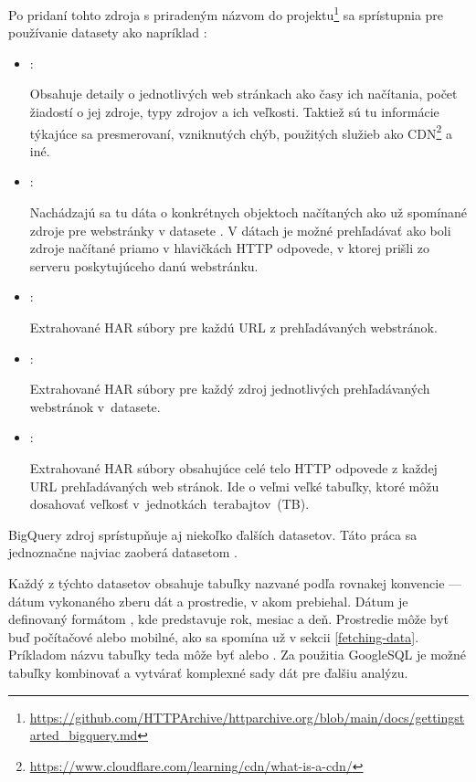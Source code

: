 \pagebreak

\noindent Po pridaní tohto zdroja s priradeným názvom  do projektu\footnote{\href{https://github.com/HTTPArchive/httparchive.org/blob/main/docs/gettingstarted\_bigquery.md}{https://github.com/HTTPArchive/httparchive.org/blob/main/docs/gettingstarted\_bigquery.md}} sa sprístupnia pre používanie datasety ako napríklad \cite{httparchive-repo}:

\begin{itemize}
    \item {}:

    Obsahuje detaily o jednotlivých web stránkach ako časy ich načítania, počet žiadostí o jej zdroje, typy zdrojov a ich veľkosti.
    Taktiež sú tu informácie týkajúce sa presmerovaní, vzniknutých chýb, použitých služieb ako CDN\footnote{\href{https://www.cloudflare.com/learning/cdn/what-is-a-cdn/}{https://www.cloudflare.com/learning/cdn/what-is-a-cdn/}} a iné.
    
    \item {}:

    Nachádzajú sa tu dáta o konkrétnych objektoch načítaných ako už spomínané zdroje pre webstránky v datasete .
    V dátach je možné prehľadávať ako boli zdroje načítané priamo v hlavičkách HTTP odpovede, v ktorej prišli zo serveru poskytujúceho danú webstránku.
    
    \item {}:

    Extrahované HAR súbory pre každú URL z prehľadávaných webstránok.
    
    \item {}:

    Extrahované HAR súbory pre každý zdroj jednotlivých prehľadávaných webstránok \mbox{v  datasete}.
    
    \item {}:

    Extrahované HAR súbory obsahujúce celé telo HTTP odpovede z každej URL prehľadávaných web stránok.
    Ide o veľmi veľké tabuľky, ktoré môžu dosahovať veľkosť \mbox{v jednotkách terabajtov (TB)}.
\end{itemize}

BigQuery zdroj  sprístupňuje aj niekoľko ďalších datasetov. Táto práca sa jednoznačne najviac zaoberá datasetom .

Každý z týchto datasetov obsahuje tabuľky nazvané podľa rovnakej konvencie --- dátum vykonaného zberu dát a prostredie, v akom prebiehal.
Dátum je definovaný formátom , kde  predstavuje rok,  mesiac a  deň. 
Prostredie môže byť buď počítačové alebo mobilné, ako sa spomína už v sekcii \ref{fetching-data}.
Príkladom názvu tabuľky teda môže byť  alebo .
Za použitia GoogleSQL je možné tabuľky kombinovať a vytvárať komplexné sady dát pre ďalšiu analýzu.

